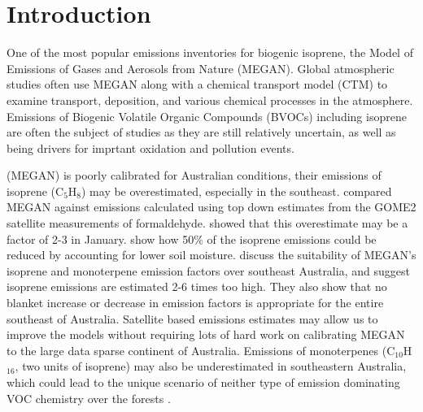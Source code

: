 \section{Introduction}  
\label{BioIsop:intro}  
  
  One of the most popular emissions inventories for biogenic isoprene, the Model of Emissions of Gases and Aerosols from Nature (MEGAN).
  Global atmospheric studies often use MEGAN along with a chemical transport model (CTM) to examine transport, deposition, and various chemical processes in the atmosphere.
  Emissions of Biogenic Volatile Organic Compounds (BVOCs) including isoprene are often the subject of studies as they are still relatively uncertain, as well as being drivers for imprtant oxidation and pollution events.
  
  (MEGAN) is poorly calibrated for Australian conditions, their emissions of isoprene (C$_5$H$_8$) may be overestimated, especially in the southeast.
  \cite{Muller2008} compared MEGAN against emissions calculated using top down estimates from the GOME2 satellite measurements of formaldehyde.
  \cite{Stavrakou2015} showed that this overestimate may be a factor of 2-3 in January.
  \cite{Sindelarova2014} show how 50\% of the isoprene emissions could be reduced by accounting for lower soil moisture.
  \cite{Emmerson2016} discuss the suitability of MEGAN's isoprene and monoterpene emission factors over southeast Australia, and suggest isoprene emissions are estimated 2-6 times too high.
  They also show that no blanket increase or decrease in emission factors is appropriate for the entire southeast of Australia.
  Satellite based emissions estimates may allow us to improve the models without requiring lots of hard work on calibrating MEGAN to the large data sparse continent of Australia.
  Emissions of monoterpenes (C$_10$H$_16$, two units of isoprene) may also be underestimated in southeastern Australia, which could lead to the unique scenario of neither type of emission dominating VOC chemistry over the forests \citep{Emmerson2016}.
  
